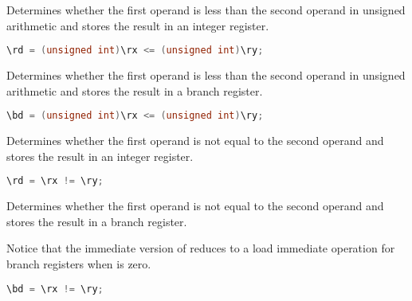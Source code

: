 Determines whether the first operand is less than the second operand in unsigned
arithmetic and stores the result in an integer register.

\begin{lstlisting}[numbers=none, basicstyle=\ttfamily\footnotesize, language=C++]
\rd = (unsigned int)\rx <= (unsigned int)\ry;
\end{lstlisting}

Determines whether the first operand is less than the second operand in unsigned
arithmetic and stores the result in a branch register.

\begin{lstlisting}[numbers=none, basicstyle=\ttfamily\footnotesize, language=C++]
\bd = (unsigned int)\rx <= (unsigned int)\ry;
\end{lstlisting}

Determines whether the first operand is not equal to the second operand and
stores the result in an integer register.

\begin{lstlisting}[numbers=none, basicstyle=\ttfamily\footnotesize, language=C++]
\rd = \rx != \ry;
\end{lstlisting}

Determines whether the first operand is not equal to the second operand and
stores the result in a branch register.

Notice that the immediate version of  reduces to a load immediate
operation for branch registers when  is zero.

\begin{lstlisting}[numbers=none, basicstyle=\ttfamily\footnotesize, language=C++]
\bd = \rx != \ry;
\end{lstlisting}

